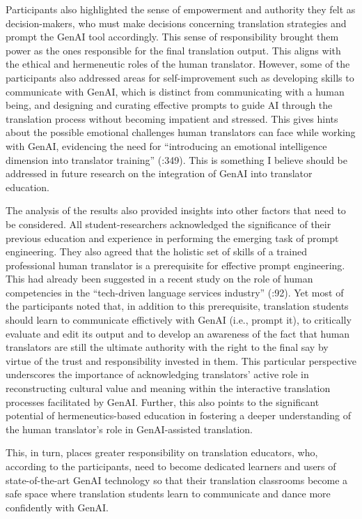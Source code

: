 \documentclass[output=paper,colorlinks,citecolor=brown]{langscibook}
\begin{document}
Participants also highlighted the sense of empowerment and authority they felt as decision-makers, who must make decisions concerning translation strategies and prompt the GenAI tool accordingly. This sense of responsibility brought them power as the ones responsible for the final translation output. This aligns with the ethical and hermeneutic roles of the human translator. However, some of the participants also addressed areas for self-improvement such as developing skills to communicate with GenAI, which is distinct from communicating with a human being, and designing and curating effective prompts to guide AI through the translation process without becoming impatient and stressed. This gives hints about the possible emotional challenges human translators can face while working with GenAI, evidencing the need for “introducing an emotional intelligence dimension into translator training” (\cite{Penet2023}:349). This is something I believe should be addressed in future research on the integration of GenAI into translator education.

The analysis of the results also provided insights into other factors that need to be considered. All student-researchers acknowledged the significance of their previous education and experience in performing the emerging task of prompt engineering. They also agreed that the holistic set of skills of a trained professional human translator is a prerequisite for effective prompt engineering. This had already been suggested in a recent study on the role of human competencies in the “tech-driven language services industry” (\cite{Isinzehra2024}:92). Yet most of the participants noted that, in addition to this prerequisite, translation students should learn to communicate effictively with GenAI (i.e., prompt it), to critically evaluate and edit its output and to develop an awareness of the fact that human translators are still the ultimate authority with the right to the final say by virtue of the trust and responsibility invested in them. This particular perspective underscores the importance of acknowledging translators' active role in reconstructing cultural value and meaning within the interactive translation processes facilitated by GenAI. Further, this also points to the significant potential of hermeneutics-based education in fostering a deeper understanding of the human translator’s role in GenAI-assisted translation.

This, in turn, places greater responsibility on translation educators, who, according to the participants, need to become dedicated learners and users of state-of-the-art GenAI technology so that their translation classrooms become a safe space where translation students learn to communicate and dance more confidently with GenAI.
\end{document}
